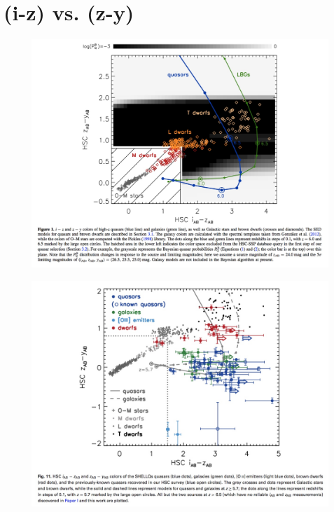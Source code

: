 \documentclass[11pt,a4paper]{article}
\begin{document}
\section{(i-z) vs. (z-y)}
    \begin{figure}
      \centering
      \includegraphics[width=16.0cm,  trim={1.5cm 0 0 0},clip]
      {Matsuoka_2016_Fig1.jpeg}
      \caption[]{\citet{Matsuoka2016}}
      \label{fig:Matsuoka2016}
    \end{figure}

    \begin{figure}
      \centering
      \includegraphics[width=16.0cm,  trim={1.5cm 0 0 0},clip]
      {Matsuoka_2018_Fig11.jpeg}
      \caption[]{\citet{Matsuoka2018}}
      \label{fig:Matsuoka2018}
    \end{figure}
\end{document}

